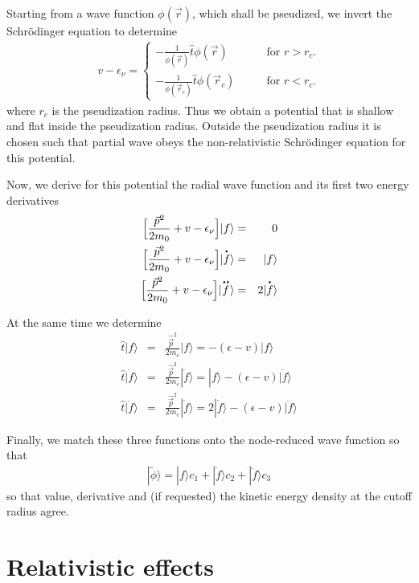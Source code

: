 \documentclass[11pt,a4paper]{report}
\begin{document}
Starting from a wave function $\phi(\vec{r})$, which shall be
pseudized, we invert the Schr\"odinger equation to determine
\begin{eqnarray}
v-\epsilon_\nu=
\begin{cases}
-\frac{1}{\phi(\vec{r})}\hat{t}\phi(\vec{r})&\qquad\text{for $r>r_c$.}
\\
-\frac{1}{\phi(\vec{r}_c)}\hat{t}\phi(\vec{r}_c)&\qquad\text{for $r<r_c$.}
\end{cases}
\end{eqnarray}
where $r_c$ is the pseudization radius. Thus we obtain a potential
that is shallow and flat inside the pseudization radius. Outside the
pseudization radius it is chosen such that partial wave obeys the
non-relativistic Schr\"odinger equation for this potential.

Now, we derive for this potential the radial wave function and its
first two energy derivatives
\begin{eqnarray}
\Bigl[\frac{\vec{p}^2}{2m_0}+v-\epsilon_\nu\Bigr]|f\rangle&=&0
\nonumber\\
\Bigl[\frac{\vec{p}^2}{2m_0}+v-\epsilon_\nu\Bigr]|\dot{f}\rangle&=&|f\rangle
\nonumber\\
\Bigl[\frac{\vec{p}^2}{2m_0}+v-\epsilon_\nu\Bigr]|\ddot{f}\rangle
&=&2|\dot{f}\rangle
\end{eqnarray}

At the same time we determine 
\begin{eqnarray}
\hat{t}|f\rangle&=&\frac{\hat{\vec{p}}^2}{2m_e}|f\rangle
=-(\epsilon-v)|f\rangle
\nonumber\\
\hat{t}|\dot{f}\rangle&=&\frac{\hat{\vec{p}}^2}{2m_e}|\dot{f}\rangle
=|f\rangle-(\epsilon-v)|\dot{f}\rangle
\nonumber\\
\hat{t}|\ddot{f}\rangle&=&\frac{\hat{\vec{p}}^2}{2m_e}|\dot{f}\rangle
=2|\dot{f}\rangle-(\epsilon-v)|\ddot{f}\rangle
\end{eqnarray}

Finally, we match these three functions onto the node-reduced wave
function so that
\begin{eqnarray}
|\tilde{\phi}\rangle=|f\rangle c_1 
+|\dot{f}\rangle c_2+|\ddot{f}\rangle c_3
\end{eqnarray}
so that value, derivative and (if requested) the kinetic energy
density at the cutoff radius agree.

\section{Relativistic effects}
\end{document}
